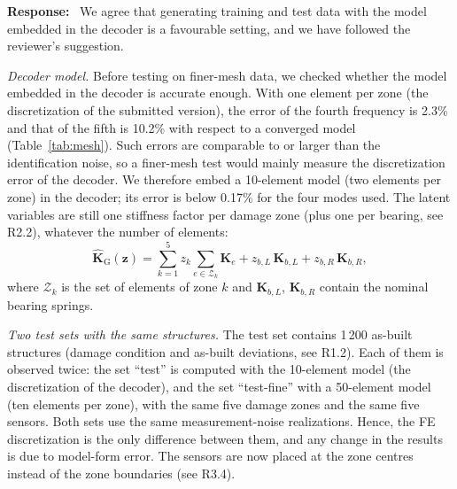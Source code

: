\documentclass[11pt]{article}
\newenvironment{response}{\par\smallskip\noindent\color{resp}\textbf{Response:}\ }{\par}
\newcommand{\z}{\mathbf{z}}
\begin{document}
\begin{response}
We agree that generating training and test data with the model embedded in the decoder is a favourable setting, and
we have followed the reviewer's suggestion.

\textit{Decoder model.} Before testing on finer-mesh data, we checked whether the model embedded in the decoder is
accurate enough. With one element per zone (the discretization of the submitted version), the error of the fourth
frequency is 2.3\% and that of the fifth is 10.2\% with respect to a converged model (Table~\ref{tab:mesh}). Such errors are comparable to or
larger than the identification noise, so a finer-mesh test would mainly measure the discretization error of the
decoder. We therefore embed a 10-element model (two elements per zone) in the decoder; its error is below 0.17\% for the
four modes used. The latent variables are still one stiffness factor per damage zone (plus one per bearing, see R2.2),
whatever the number of elements:
\begin{equation}
\hat{\mathbf{K}}_{\mathrm{G}}(\z)=\sum_{k=1}^{5} z_k\sum_{e\in\mathcal{Z}_k}\mathbf{K}_{e}
+z_{b,L}\,\mathbf{K}_{b,L}+z_{b,R}\,\mathbf{K}_{b,R},
\label{eq:Kz}
\end{equation}
where $\mathcal{Z}_k$ is the set of elements of zone $k$ and $\mathbf{K}_{b,L}$, $\mathbf{K}_{b,R}$ contain the nominal
bearing springs.

\textit{Two test sets with the same structures.} The test set contains 1\,200 as-built structures (damage condition and
as-built deviations, see R1.2). Each of them is observed twice: the set ``test'' is computed with the 10-element model
(the discretization of the decoder), and the set ``test-fine'' with a 50-element model (ten elements per zone), with the
same five damage zones and the same five sensors. Both sets use the same measurement-noise realizations. Hence, the FE
discretization is the only difference between them, and any change in the results is due to model-form error. The
sensors are now placed at the zone centres instead of the zone boundaries (see R3.4).


\end{response}
\end{document}
